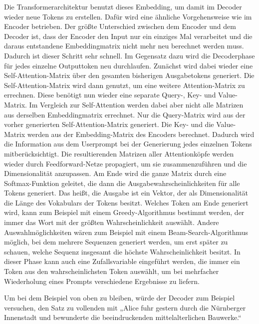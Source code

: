 Die Transformerarchitektur benutzt dieses Embedding, um damit im Decoder wieder neue Tokens zu erstellen.
Dafür wird eine ähnliche Vorgehensweise wie im Encoder betrieben.
Der größte Unterschied zwischen dem Encoder und dem Decoder ist, dass der Encoder den Input nur ein einziges Mal verarbeitet und die daraus entstandene Embeddingmatrix nicht mehr neu berechnet werden muss.
Dadurch ist dieser Schritt sehr schnell.
Im Gegensatz dazu wird die Decoderphase für jedes einzelne Outputtoken neu durchlaufen.
Zunächst wird dabei wieder eine Self-Attention-Matrix über den gesamten bisherigen Ausgabetokens generiert.
Die Self-Attention-Matrix wird dann genutzt, um eine weitere Attention-Matrix zu errechnen.
Diese benötigt nun wieder eine separate Query-, Key- und Value-Matrix.
Im Vergleich zur Self-Attention werden dabei aber nicht alle Matrizen aus derselben Embeddingmatrix errechnet.
Nur die Query-Matrix wird aus der vorher generierten Self-Attention-Matrix generiert.
Die Key- und die Value-Matrix werden aus der Embedding-Matrix des Encoders berechnet.
Dadurch wird die Information aus dem Userprompt bei der Generierung jedes einzelnen Tokens mitberücksichtigt.
Die resultierenden Matrizen aller Attentionköpfe werden wieder durch Feedforward-Netze propagiert, um sie zusammenzuführen und die Dimensionalität anzupassen.
Am Ende wird die ganze Matrix durch eine Softmax-Funktion geleitet, die dann die Ausgabewahrscheinlichkeiten für alle Tokens generiert.
Das heißt, die Ausgabe ist ein Vektor, der als Dimensionalität die Länge des Vokabulars der Tokens besitzt.
Welches Token am Ende generiert wird, kann zum Beispiel mit einem Greedy-Algorithmus bestimmt werden, der immer das Wort mit der größten Wahrscheinlichkeit auswählt.
Andere Auswahlmöglichkeiten wären zum Beispiel mit einem Beam-Search-Algorithmus möglich, bei dem mehrere Sequenzen generiert werden, um erst später zu schauen, welche Sequenz insgesamt die höchste Wahrscheinlichkeit besitzt.
In dieser Phase kann auch eine Zufallsvariable eingeführt werden, die immer ein Token aus den wahrscheinlichsten Token auswählt, um bei mehrfacher Wiederholung eines Prompts verschiedene Ergebnisse zu liefern.

Um bei dem Beispiel von oben zu bleiben, würde der Decoder zum Beispiel versuchen, den Satz zu vollenden mit „Alice fuhr gestern durch die Nürnberger Innenstadt und bewunderte die beeindruckenden mittelalterlichen Bauwerke.“~\cite{vaswani2023}



